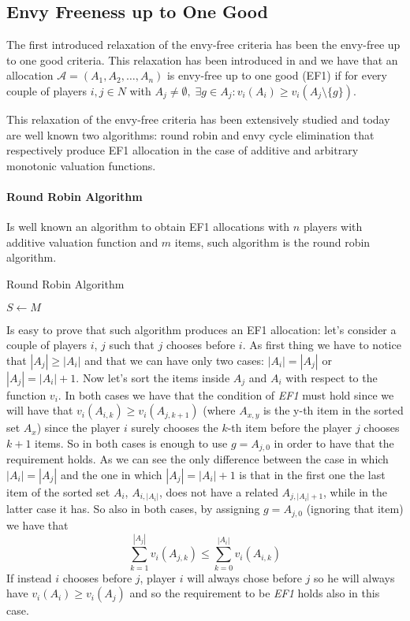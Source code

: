 \subsection{Envy Freeness up to One Good}
The first introduced relaxation of the envy-free criteria has been the envy-free up to one good criteria. This relaxation has been introduced in \cite{DBLP:LiptonMMS04-EF1} and we have that an allocation $\mathcal{A} = (A_1, A_2, \dots, A_n)$ is envy-free up to one good (EF1) if for every couple of players $i,j\in N$ with $A_j\ne \emptyset, \; \exists g\in A_j: v_i(A_i)\ge v_i(A_j\setminus \{g\})$.

This relaxation of the envy-free criteria has been extensively studied and today are well known two algorithms: round robin and envy cycle elimination that respectively produce EF1 allocation in the case of additive and arbitrary monotonic valuation functions.

\paragraph{Round Robin Algorithm}
Is well known an algorithm to obtain EF1 allocations with $n$ players with additive valuation function and $m$ items, such algorithm is the round robin algorithm.
\begin{algorithm}
\caption{Round Robin Algorithm}\label{alg:round-robin}
$S\gets M$\;
\end{algorithm}
Is easy to prove that such algorithm produces an EF1 allocation: let's consider a couple of players $i$, $j$ such that $j$ chooses before $i$. As first thing we have to notice that $|A_j| \ge |A_i|$ and that we can have only two cases:  $|A_i| = |A_j| $ or $|A_j| = |A_i| + 1$. Now let's sort the items inside $A_j$ and $A_i$ with respect to the function $v_i$. In both cases we have that the condition of \textit{EF1} must hold since we will have that $v_i(A_{i,k})\ge v_i(A_{j,k+1}) $ 
(where $A_{x,y}$ is the y-th item in the sorted set $A_x$) since the player $i$ surely chooses the $k$-th item before the player $j$ chooses $k+1$ items. So in both cases is enough to use $g = A_{j,0}$ in order to have that the requirement holds. 
As we can see the only difference between the case in which $|A_i| = |A_j| $ and the one in which $|A_j| = |A_i| + 1$ is that in the first one the last item of the sorted set $A_i$, $A_{i, |A_{i}|}$, does not have a related $A_{j, |A_{i}| + 1}$, while in the latter case it has. So also in both cases, by  assigning $g = A_{j,0}$ (ignoring that item) we have that 
$$
    \sum_{k=1}^{|A_j|} v_i(A_{j,k}) \le \sum_{k=0}^{|A_i|} v_i(A_{i,k}) 
$$
If instead $i$ chooses before $j$, player $i$ will always chose before $j$ so he will always have $v_i(A_i)\ge v_i(A_j)$ and so the requirement to be  \textit{EF1} holds also in this case.

